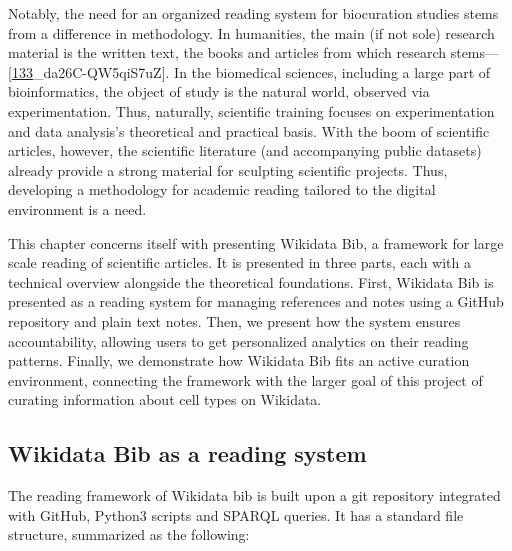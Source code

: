 Notably, the need for an organized reading system for biocuration studies stems from a difference in methodology.
In humanities, the main (if not sole) research material is the written text, the books and articles from which research stems---{[}\protect\hyperlink{ref-PKhuVRW8}{133}\_da26C-QW5qiS7uZ{]}.
In the biomedical sciences, including a large part of bioinformatics, the object of study is the natural world, observed via experimentation.
Thus, naturally, scientific training focuses on experimentation and data analysis's theoretical and practical basis.
With the boom of scientific articles, however, the scientific literature (and accompanying public datasets) already provide a strong material for sculpting scientific projects.
Thus, developing a methodology for academic reading tailored to the digital environment is a need.

This chapter concerns itself with presenting Wikidata Bib, a framework for large scale reading of scientific articles.
It is presented in three parts, each with a technical overview alongside the theoretical foundations.
First, Wikidata Bib is presented as a reading system for managing references and notes using a GitHub repository and plain text notes.
Then, we present how the system ensures accountability, allowing users to get personalized analytics on their reading patterns.
Finally, we demonstrate how Wikidata Bib fits an active curation environment, connecting the framework with the larger goal of this project of curating information about cell types on Wikidata.

\hypertarget{wikidata-bib-as-a-reading-system}{%
\subsection{Wikidata Bib as a reading system}\label{wikidata-bib-as-a-reading-system}}

The reading framework of Wikidata bib is built upon a git repository integrated with GitHub, Python3 scripts and SPARQL queries.
It has a standard file structure, summarized as the following:

